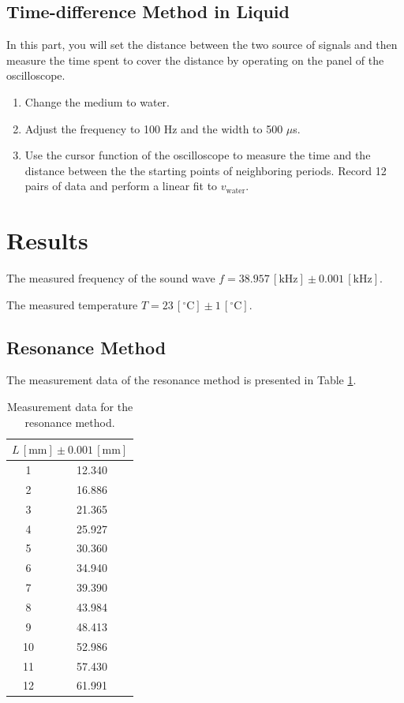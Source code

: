 \documentclass[a4paper]{article}
\begin{document}
\subsection{Time-difference Method in Liquid}
\noindent In this part, you will set the distance between the two source of signals and then measure the time spent to cover the distance by operating on the panel of the oscilloscope.

\begin{enumerate}
\item Change the medium to water.
\item Adjust the frequency to 100 Hz and the width to 500 $\mu$s.
\item Use the cursor function of the oscilloscope to measure the time and the distance between the the starting points of neighboring periods. Record 12 pairs of data and perform a linear fit to $v_\text{water}$.
\end{enumerate}



\section{Results}
\vspace{-6pt}
The measured frequency of the sound wave $f = 38.957\, [\text{kHz}] \pm 0.001\, [\text{kHz}]$.

The measured temperature $T = 23\,[^{\circ}\text{C}] \pm 1\, [^{\circ}\text{C}]$.
\vspace{-8pt}

\subsection{Resonance Method}

The measurement data of the resonance method is presented in Table \ref{Tab:ResMe}.

\begin{table}[htbp]
\centering
\begin{tabular}{cc}
\hline
\multicolumn{2}{c}{$L\, [\text{mm}] \pm 0.001\, [\text{mm}]$} \\
\hline
1 & 12.340 \\
2 & 16.886 \\
3 & 21.365 \\
4 & 25.927 \\
5 & 30.360 \\
6 & 34.940 \\
7 & 39.390 \\
8 & 43.984 \\
9 & 48.413 \\
10 & 52.986 \\
11 & 57.430 \\
12 & 61.991 \\
\hline
\end{tabular}
\caption{Measurement data for the resonance method.}\label{Tab:ResMe}
\end{table}
\end{document}
